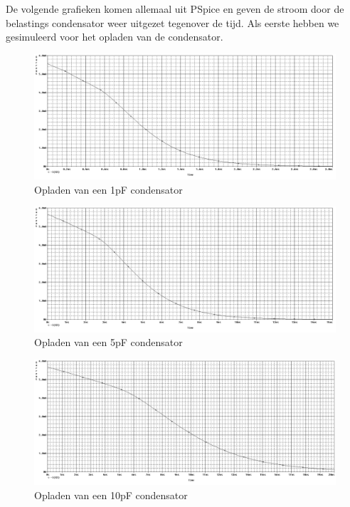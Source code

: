 \documentclass{article}
\begin{document}
De volgende grafieken komen allemaal uit PSpice en geven de stroom door de belastings condensator weer uitgezet tegenover de tijd. Als eerste hebben we gesimuleerd voor het opladen van de condensator.

\begin{figure}[H]
	\centering
	\includegraphics[scale=0.4]{figures/opladen1p}
	\caption{Opladen van een 1pF condensator}
\end{figure}

\begin{figure}[H]
	\centering
	\includegraphics[scale=0.4]{figures/opladen5p}
	\caption{Opladen van een 5pF condensator}
\end{figure}

\begin{figure}[H]
	\centering
	\includegraphics[scale=0.4]{figures/opladen10p}
	\caption{Opladen van een 10pF condensator}
\end{figure}
\end{document}
